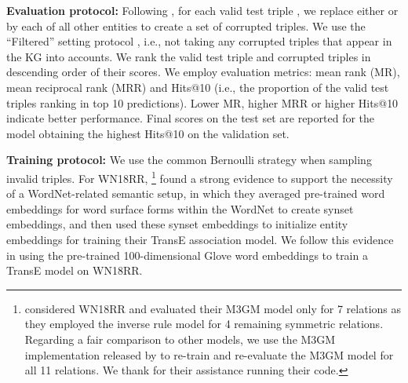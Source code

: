 \documentclass[11pt,a4paper]{article}
\begin{document}
\begin{table}[!htb]
\centering
{}
\caption{Statistics of the experimental  datasets. \#E is the number of entities. \#R is the number of relations.}
\label{tab:datasets}
\end{table}

\noindent\textbf{Evaluation protocol:}
Following \citet{NIPS2013_5071}, for each valid test triple , we replace either  or  by each of all other entities to create a set of corrupted triples.
We use the ``{Filtered}'' setting protocol \citep{NIPS2013_5071}, i.e., not taking  any corrupted triples that appear in the KG into accounts.
We rank the valid test triple and corrupted triples in descending order of their scores.
We employ evaluation metrics: mean rank (MR), mean reciprocal rank (MRR) and Hits@10 (i.e., the proportion of the valid test triples ranking in top {10} predictions).
Lower MR, higher MRR or higher Hits@{10} indicate better performance. Final scores on the test set are reported for the model obtaining the
highest Hits@10 on the validation set.


\noindent\textbf{Training protocol:}
We use the common Bernoulli strategy \citep{AAAI148531,AAAI159571} when sampling invalid triples. 
For WN18RR, \citet{yuvalpinterm3gm}\footnote{
\citet{yuvalpinterm3gm} considered WN18RR and evaluated their M3GM model only for 7 relations as they employed the inverse rule model \citep{Dettmers2017} for 4 remaining symmetric relations. 
Regarding a fair comparison to other models, we use the M3GM implementation released by \citet{yuvalpinterm3gm} to re-train and re-evaluate the M3GM model for all 11 relations. 
We thank \citet{yuvalpinterm3gm} for their assistance running their code.
} 
found a strong evidence to support the necessity of a WordNet-related semantic setup, in which they averaged pre-trained word embeddings for word surface forms within the WordNet to create synset embeddings, and then used these synset embeddings to initialize entity embeddings for training their TransE association model.
We follow this evidence in using the pre-trained 100-dimensional Glove word embeddings \citep{pennington2014glove} to train a TransE model on WN18RR.
\end{document}
